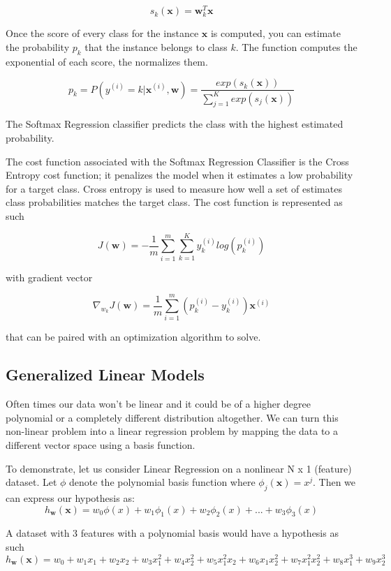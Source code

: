 \documentclass[12pt]{article}
\begin{document}
            $$ s_k(\boldsymbol{x}) = \boldsymbol{w}^T_k\boldsymbol{x} $$

            Once the score of every class for the instance $\boldsymbol{x}$ is computed, you can estimate the probability $p_k$ that the instance belongs to class $k$. The function computes the exponential of each score, 
            the normalizes them.

            $$ p_k = P(y^{(i)} = k | \boldsymbol{x}^{(i)}, \boldsymbol{w}) = \frac{exp(s_k(\boldsymbol{x}))}{\sum_{j=1}^K exp(s_j(\boldsymbol{x}))} $$

            The Softmax Regression classifier predicts the class with the highest estimated probability.

            The cost function associated with the Softmax Regression Classifier is the Cross Entropy cost function; it penalizes the model when it estimates a low probability for a target class. Cross entropy is used to
            measure how well a set of estimates class probabilities matches the target class. The cost function is represented as such

            $$ J(\boldsymbol{w}) = -\frac{1}{m}\sum_{i=1}^m \sum_{k=1}^K y_k^{(i)} log(p^{(i)}_k) $$

            with gradient vector

            $$ \nabla_{w_k} J(\boldsymbol{w}) = \frac{1}{m}\sum_{i=1}^m(p^{(i)}_k - y^{(i)}_k)\boldsymbol{x}^{(i)} $$

            that can be paired with an optimization algorithm to solve.

    \subsection{Generalized Linear Models}
        Often times our data won't be linear and it could be of a higher degree polynomial or a completely different distribution altogether. We can turn this non-linear problem into 
        a linear regression problem by mapping the data to a different vector space using a basis function.

        To demonstrate, let us consider Linear Regression on a nonlinear N x 1 (feature) dataset. Let $\phi$ denote the polynomial basis function where
        $\phi_j(\boldsymbol{x}) = x^j$. Then we can express our hypothesis as: 
        $$ h_{\boldsymbol{w}}(\boldsymbol{x}) = w_0\phi(x) + w_1\phi_1(x) + w_2\phi_2(x) + ... + w_3\phi_3(x) $$

        A dataset with 3 features with a polynomial basis would have a hypothesis as such
        $$ h_{\boldsymbol{w}}(\boldsymbol{x}) = w_0 + w_1x_1 + w_2x_2 + w_3x_1^2 + w_4x_2^2 + w_5x_1^2x_2 + w_6x_1x_2^2 + w_7x_1^2x_2^2 + w_8x_1^3 + w_9x_2^3 $$
\end{document}
